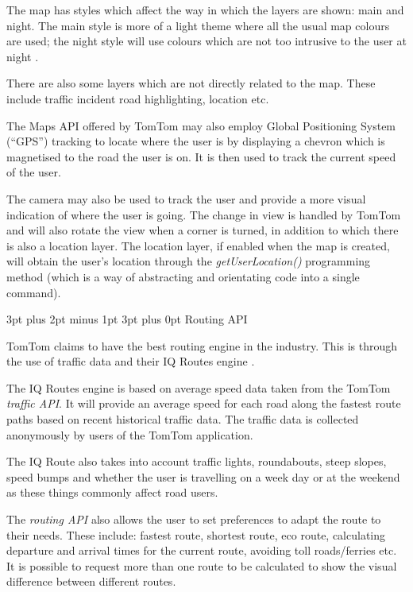 \documentclass[12pt,a4paper]{article}
\makeatletter
\renewcommand\subsection{\@startsection {subsection}{1}{0mm} %
                               {3pt plus 2pt minus 1pt} %
                               {3pt plus 0pt} %
                               {\normalfont\bfseries}}
\makeatother
\begin{document}
The map has styles which affect the way in which the layers are shown: main and night. The main style is more of a light theme where all the usual map colours are used; the night style will use colours which are not too intrusive to the user at night \cite{TomTomLayers}.

There are also some layers which are not directly related to the map. These include traffic incident road highlighting, location etc.

The Maps API offered by TomTom may also employ Global Positioning System (\enquote{GPS}) tracking to locate where the user is by displaying a chevron which is magnetised to the road the user is on. It is then used to track the current speed of the user.

The camera may also be used to track the user and provide a more visual indication of where the user is going. The change in view is handled by TomTom and will also rotate the view when a corner is turned, in addition to which there is also a location layer. The location layer, if enabled when the map is created, will obtain the user’s location through the \textit{getUserLocation()} programming method (which is a way of abstracting and orientating code into a single command).

\subsection{Routing API}

TomTom claims to have the best routing engine in the industry. This is through the use of traffic data and their IQ Routes engine \cite{TomTomIQ}.

The IQ Routes engine is based on average speed data taken from the TomTom \textit{traffic API}. It will provide an average speed for each road along the fastest route paths based on recent historical traffic data. The traffic data is collected anonymously by users of the TomTom application. 

The IQ Route also takes into account traffic lights, roundabouts, steep slopes, speed bumps and whether the user is travelling on a week day or at the weekend as these things commonly affect road users.

The \textit{routing API} also allows the user to set preferences to adapt the route to their needs. These include: fastest route, shortest route, eco route, calculating departure and arrival times for the current route, avoiding toll roads/ferries etc. It is possible to request more than one route to be calculated to show the visual difference between different routes.
\end{document}
